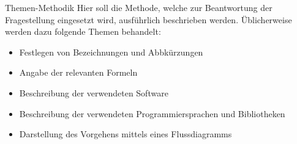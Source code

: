 %
\begin{simplebox}{Themen-Methodik}
%
Hier soll die Methode, welche zur Beantwortung der Fragestellung eingesetzt wird, ausführlich beschrieben werden.
Üblicherweise werden dazu folgende Themen behandelt:
%
\begin{itemize}
\item Festlegen von Bezeichnungen und Abbkürzungen 
\item Angabe der relevanten Formeln 
\item Beschreibung der verwendeten Software 
\item Beschreibung der verwendeten Programmiersprachen und Bibliotheken
\item Darstellung des Vorgehens mittels eines Flussdiagramms
\end{itemize}
%
\end{simplebox}
%
